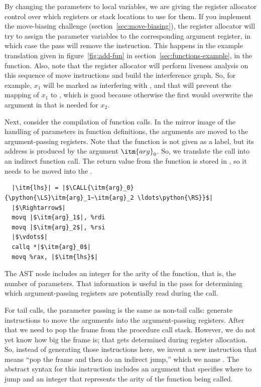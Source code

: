 \documentclass[7x10]{TimesAPriori_MIT}%
\def\pythonEd{1}
\def\edition{1}
\newcommand{\pythonColor}[0]{}
\newcommand{\python}[1]{{\if\edition\pythonEd\pythonColor #1\fi}}
\numberwithin{theorem}{chapter}
\numberwithin{definition}{chapter}
\numberwithin{equation}{chapter}
\begin{document}
By changing the parameters to local variables, we are giving the
register allocator control over which registers or stack locations to
use for them. If you implement the move-biasing challenge
(section~\ref{sec:move-biasing}), the register allocator will try to
assign the parameter variables to the corresponding argument register,
in which case the  pass will remove the
 instruction. This happens in the example translation given
in figure~\ref{fig:add-fun} in section~\ref{sec:functions-example}, in
the  function.
%
Also, note that the register allocator will perform liveness analysis
on this sequence of move instructions and build the interference
graph. So, for example, $x_1$ will be marked as interfering with
, and that will prevent the mapping of $x_1$ to ,
which is good because otherwise the first  would overwrite
the argument in  that is needed for $x_2$.

Next, consider the compilation of function calls. In the mirror image
of the handling of parameters in function definitions, the arguments
are moved to the argument-passing registers.  Note that the function
is not given as a label, but its address is produced by the argument
$\itm{arg}_0$. So, we translate the call into an indirect function
call. The return value from the function is stored in , so
it needs to be moved into the .
\begin{lstlisting}
  |\itm{lhs}| = |$\CALL{\itm{arg}_0}{\python{\LS}\itm{arg}_1~\itm{arg}_2 \ldots\python{\RS}}$|
  |$\Rightarrow$|
  movq |$\itm{arg}_1$|, %rdi
  movq |$\itm{arg}_2$|, %rsi
  |$\vdots$|
  callq *|$\itm{arg}_0$|
  movq %rax, |$\itm{lhs}$|
\end{lstlisting}
The  AST node includes an integer for the arity of
the function, that is, the number of parameters. That information is
useful in the  pass for determining which
argument-passing registers are potentially read during the call.

For tail calls, the parameter passing is the same as non-tail calls:
generate instructions to move the arguments into the argument-passing
registers.  After that we need to pop the frame from the procedure
call stack.  However, we do not yet know how big the frame is; that
gets determined during register allocation. So, instead of generating
those instructions here, we invent a new instruction that means ``pop
the frame and then do an indirect jump,'' which we name
. The abstract syntax for this instruction includes an
argument that specifies where to jump and an integer that represents
the arity of the function being called.
\end{document}
